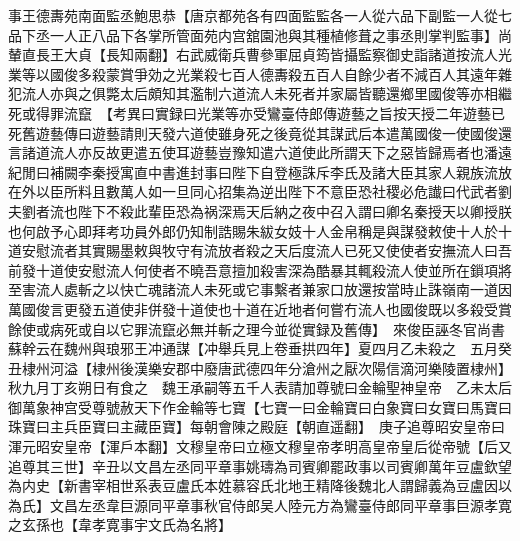事王德夀苑南面監丞鮑思恭【唐京都苑各有四面監監各一人從六品下副監一人從七品下丞一人正八品下各掌所管面苑内宫舘園池與其種植修葺之事丞則掌判監事】尚輦直長王大貞【長知兩翻】右武威衛兵曹參軍屈貞筠皆攝監察御史詣諸道按流人光業等以國俊多殺蒙賞爭効之光業殺七百人德夀殺五百人自餘少者不減百人其遠年雜犯流人亦與之俱斃太后頗知其濫制六道流人未死者并家屬皆聽還鄉里國俊等亦相繼死或得罪流竄　【考異曰實録曰光業等亦受鸞臺侍郎傳遊藝之旨按天授二年遊藝已死舊遊藝傳曰遊藝請則天發六道使雖身死之後竟從其謀武后本遣萬國俊一使國俊還言諸道流人亦反故更遣五使耳遊藝豈豫知遣六道使此所謂天下之惡皆歸焉者也潘遠紀閒曰補闕李秦授寓直中書進封事曰陛下自登極誅斥李氏及諸大臣其家人親族流放在外以臣所料且數萬人如一旦同心招集為逆出陛下不意臣恐社稷必危䜟曰代武者劉夫劉者流也陛下不殺此輩臣恐為祸深焉天后納之夜中召入謂曰卿名秦授天以卿授朕也何啟予心即拜考功員外郎仍知制誥賜朱紱女妓十人金帛稱是與謀發敕使十人於十道安慰流者其實賜墨敕與牧守有流放者殺之天后度流人已死又使使者安撫流人曰吾前發十道使安慰流人何使者不曉吾意擅加殺害深為酷暴其輒殺流人使並所在鎻項將至害流人處斬之以快亡魂諸流人未死或它事繫者兼家口放還按當時止誅嶺南一道因萬國俊言更發五道使非併發十道使也十道在近地者何嘗冇流人也國俊既以多殺受賞餘使或病死或自以它罪流竄必無并斬之理今並從實録及舊傳】　來俊臣誣冬官尚書蘇幹云在魏州與琅邪王冲通謀【冲舉兵見上卷垂拱四年】夏四月乙未殺之　五月癸丑棣州河溢【棣州後漢樂安郡中廢唐武德四年分滄州之厭次陽信滴河樂陵置棣州】　秋九月丁亥朔日有食之　魏王承嗣等五千人表請加尊號曰金輪聖神皇帝　乙未太后御萬象神宫受尊號赦天下作金輪等七寶【七寶一曰金輪寶曰白象寶曰女寶曰馬寶曰珠寶曰主兵臣寶曰主藏臣寶】每朝會陳之殿庭【朝直遥翻】　庚子追尊昭安皇帝曰渾元昭安皇帝【渾戶本翻】文穆皇帝曰立極文穆皇帝孝明高皇帝皇后從帝號【后又追尊其三世】辛丑以文昌左丞同平章事姚璹為司賓卿罷政事以司賓卿萬年豆盧欽望為内史【新書宰相世系表豆盧氏本姓慕容氏北地王精降後魏北人謂歸義為豆盧因以為氏】文昌左丞韋巨源同平章事秋官侍郎吴人陸元方為鸞臺侍郎同平章事巨源孝寛之玄孫也【韋孝寛事宇文氏為名將】

